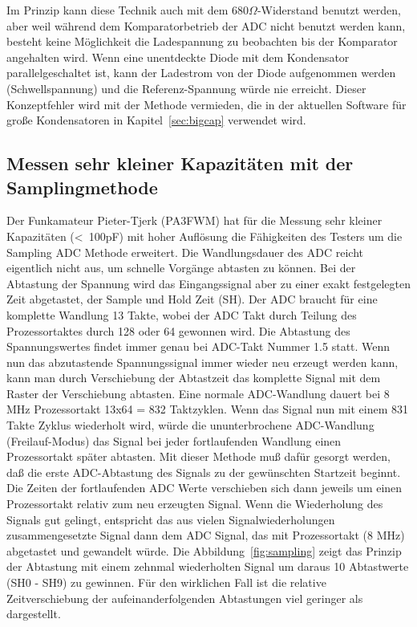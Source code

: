 Im Prinzip kann diese Technik auch mit dem \(680\Omega\)-Widerstand benutzt werden,
aber weil während dem Komparatorbetrieb der ADC nicht benutzt werden kann, besteht keine
Möglichkeit die Ladespannung zu beobachten bis der Komparator angehalten wird.
Wenn eine unentdeckte Diode mit dem Kondensator parallelgeschaltet ist, kann der Ladestrom
von der Diode aufgenommen werden (Schwellspannung) und die Referenz-Spannung würde nie erreicht.
Dieser Konzeptfehler wird mit der Methode vermieden, die in der aktuellen Software für große Kondensatoren in Kapitel~\ref{sec:bigcap}
verwendet wird.

\subsection{Messen sehr kleiner Kapazitäten mit der Samplingmethode}
Der Funkamateur Pieter-Tjerk (PA3FWM) hat für die Messung sehr kleiner Kapazitäten (\textless~100pF) mit hoher Auflösung
die Fähigkeiten des Testers um die Sampling ADC Methode erweitert.
Die Wandlungsdauer des ADC reicht eigentlich nicht aus, um schnelle Vorgänge abtasten zu können.
Bei der Abtastung der Spannung wird das Eingangssignal aber zu einer exakt festgelegten Zeit abgetastet,
der Sample und Hold Zeit (SH). Der ADC braucht für eine komplette Wandlung 13 Takte, wobei der
ADC Takt durch Teilung des Prozessortaktes durch 128 oder 64 gewonnen wird.
Die Abtastung des Spannungswertes findet immer genau bei ADC-Takt Nummer 1.5 statt. 
Wenn nun das abzutastende Spannungssignal immer wieder neu erzeugt werden kann,
kann man durch Verschiebung der Abtastzeit das komplette Signal mit dem Raster der Verschiebung abtasten.
Eine normale ADC-Wandlung dauert bei 8 MHz Prozessortakt 13x64 = 832 Taktzyklen. 
Wenn das Signal nun mit einem 831 Takte Zyklus wiederholt wird, würde die ununterbrochene ADC-Wandlung (Freilauf-Modus)
das Signal bei jeder fortlaufenden Wandlung einen Prozessortakt später abtasten.
Mit dieser Methode muß dafür gesorgt werden, daß die erste ADC-Abtastung des Signals zu der
gewünschten Startzeit beginnt. Die Zeiten der fortlaufenden ADC Werte verschieben sich dann jeweils um einen
Prozessortakt relativ zum neu erzeugten Signal. Wenn die Wiederholung des Signals gut gelingt, entspricht 
das aus vielen Signalwiederholungen zusammengesetzte Signal dann dem ADC Signal, das mit Prozessortakt (8 MHz) 
abgetastet und gewandelt würde.
Die Abbildung~\ref{fig:sampling} zeigt das Prinzip der Abtastung mit einem zehnmal wiederholten Signal
um daraus 10 Abtastwerte (SH0 - SH9) zu gewinnen.
Für den wirklichen Fall ist die relative Zeitverschiebung der aufeinanderfolgenden Abtastungen 
viel geringer als dargestellt.

